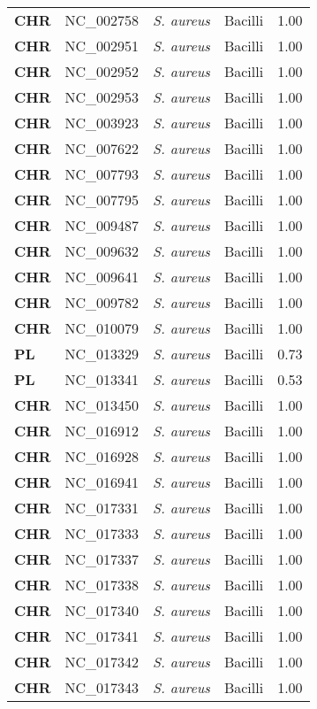 \begin{adjustwidth}{-3cm}{2cm}
{\begin{supertabular}{>{\bfseries}l|p{0.1\textwidth}p{0.14\textwidth}l|l}
CHR & NC\_002758 & \textit{S. aureus} & Bacilli & 1.00\\
CHR & NC\_002951 & \textit{S. aureus} & Bacilli & 1.00\\
CHR & NC\_002952 & \textit{S. aureus} & Bacilli & 1.00\\
CHR & NC\_002953 & \textit{S. aureus} & Bacilli & 1.00\\
CHR & NC\_003923 & \textit{S. aureus} & Bacilli & 1.00\\
CHR & NC\_007622 & \textit{S. aureus} & Bacilli & 1.00\\
CHR & NC\_007793 & \textit{S. aureus} & Bacilli & 1.00\\
CHR & NC\_007795 & \textit{S. aureus} & Bacilli & 1.00\\
CHR & NC\_009487 & \textit{S. aureus} & Bacilli & 1.00\\
CHR & NC\_009632 & \textit{S. aureus} & Bacilli & 1.00\\
CHR & NC\_009641 & \textit{S. aureus} & Bacilli & 1.00\\
CHR & NC\_009782 & \textit{S. aureus} & Bacilli & 1.00\\
CHR & NC\_010079 & \textit{S. aureus} & Bacilli & 1.00\\
PL & NC\_013329 & \textit{S. aureus} & Bacilli & 0.73\\
PL & NC\_013341 & \textit{S. aureus} & Bacilli & 0.53\\
CHR & NC\_013450 & \textit{S. aureus} & Bacilli & 1.00\\
CHR & NC\_016912 & \textit{S. aureus} & Bacilli & 1.00\\
CHR & NC\_016928 & \textit{S. aureus} & Bacilli & 1.00\\
CHR & NC\_016941 & \textit{S. aureus} & Bacilli & 1.00\\
CHR & NC\_017331 & \textit{S. aureus} & Bacilli & 1.00\\
CHR & NC\_017333 & \textit{S. aureus} & Bacilli & 1.00\\
CHR & NC\_017337 & \textit{S. aureus} & Bacilli & 1.00\\
CHR & NC\_017338 & \textit{S. aureus} & Bacilli & 1.00\\
CHR & NC\_017340 & \textit{S. aureus} & Bacilli & 1.00\\
CHR & NC\_017341 & \textit{S. aureus} & Bacilli & 1.00\\
CHR & NC\_017342 & \textit{S. aureus} & Bacilli & 1.00\\
CHR & NC\_017343 & \textit{S. aureus} & Bacilli & 1.00\\

\end{supertabular}}
\end{adjustwidth}
